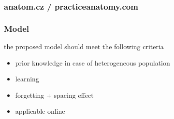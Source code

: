 \documentclass[xcolor=svgnames]{beamer}
\begin{document}
\begin{frame}
	\frametitle{anatom.cz / practiceanatomy.com}
\end{frame}
\begin{frame}
	\frametitle{Model}
	the proposed model should meet the following criteria
	\begin{itemize}
		\item prior knowledge in case of heterogeneous population
		\item learning
		\item forgetting + spacing effect
		\item applicable online
	\end{itemize}
\end{frame}
\end{document}
